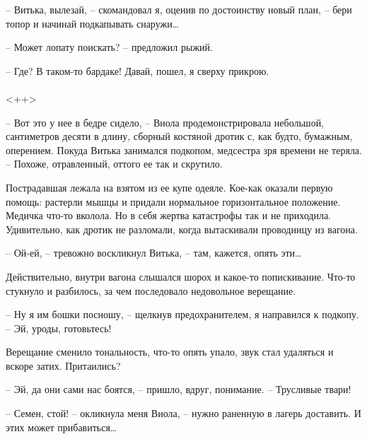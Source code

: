 \documentclass[a4paper]{book}
\begin{document}
-- Витька, вылезай, -- скомандовал я, оценив по достоинству новый план, -- бери топор и начинай подкапывать снаружи\ldots

-- Может лопату поискать? -- предложил рыжий.

-- Где? В таком-то бардаке! Давай, пошел, я сверху прикрою.

\paragraph{}<++>

-- Вот это у нее в бедре сидело, -- Виола продемонстрировала небольшой, сантиметров десяти в длину, сборный костяной дротик с, как будто, бумажным, оперением. Покуда Витька занимался подкопом, медсестра зря времени не теряла. -- Похоже, отравленный, оттого ее так и скрутило.

Пострадавшая лежала на взятом из ее купе одеяле. Кое-как оказали первую помощь: растерли мышцы и придали нормальное горизонтальное положение. Медичка что-то вколола. Но в себя жертва катастрофы так и не приходила. Удивительно, как дротик не разломали, когда вытаскивали проводницу из вагона. 

-- Ой-ей, -- тревожно воскликнул Витька, -- там, кажется, опять эти\ldots

Действительно, внутри вагона слышался шорох и какое-то попискивание. Что-то стукнуло и разбилось, за чем последовало недовольное верещание. 

-- Ну я им бошки посношу, -- щелкнув предохранителем, я направился к подкопу. -- Эй, уроды, готовьтесь!

Верещание сменило тональность, что-то опять упало, звук стал удаляться и вскоре затих. Притаились?

-- Эй, да они сами нас боятся, -- пришло, вдруг, понимание. -- Трусливые твари!

-- Семен, стой! -- окликнула меня Виола, -- нужно раненную в лагерь доставить. И этих может прибавиться\ldots 
\end{document}
